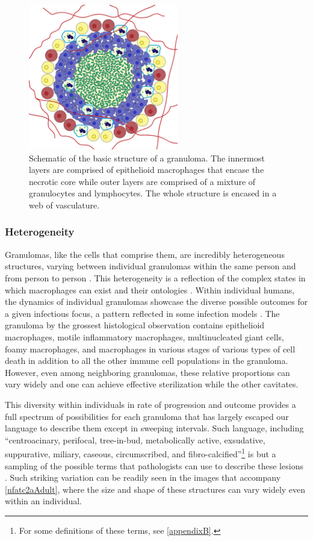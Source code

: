 \begin{figure}
\begin{center}
\includegraphics[height=2.5in]{images/granuloma2.pdf}
\caption{Schematic of the basic structure of a granuloma. The innermost layers are comprised of epithelioid macrophages that encase the necrotic core while outer layers are comprised of a mixture of granulocytes and lymphocytes. The whole structure is encased in a web of vasculature.}
\label{figure:granny}
\end{center}
\end{figure}

\subsubsection{Heterogeneity}

Granulomas, like the cells that comprise them, are incredibly heterogeneous structures, varying between individual granulomas within the same person and from person to person \citep{Matty2015, Lenaerts2015}. This heterogeneity is a reflection of the complex states in which macrophages can exist and their ontologies \citep{Kiss2018}. Within individual humans, the dynamics of individual granulomas showcase the diverse possible outcomes for a given infectious focus, a pattern reflected in some infection models \citep{Lenaerts2015, Lin2014}. The granuloma by the grossest histological observation contains epithelioid macrophages, motile inflammatory macrophages, multinucleated giant cells, foamy macrophages, and macrophages in various stages of various types of cell death in addition to all the other immune cell populations in the granuloma. However, even among neighboring granulomas, these relative proportions can vary widely and one can achieve effective sterilization while the other cavitates. 

This diversity within individuals in rate of progression and outcome provides a full spectrum of possibilities for each granuloma that has largely escaped our language to describe them except in sweeping intervals. Such language, including ``centroacinary, perifocal, tree\hyp{}in\hyp{}bud, metabolically active, exsudative, suppurative, miliary, caseous, circumscribed, and fibro\hyp{}calcified''\footnote{For some definitions of these terms, see \autoref{appendixB}.} is but a sampling of the possible terms that pathologists can use to describe these lesions \citep{Ehlers2012}. Such striking variation can be readily seen in the images that accompany \autoref{nfatc2aAdult}, where the size and shape of these structures can vary widely even within an individual.

